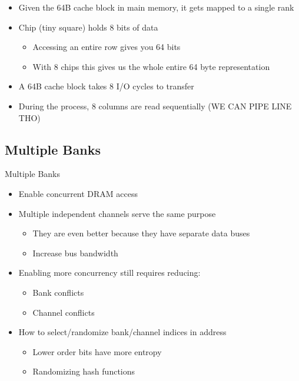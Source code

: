 \documentclass[]{article}
\providecommand{\tightlist}{%
  \setlength{\itemsep}{0pt}\setlength{\parskip}{0pt}}
\begin{document}
\begin{itemize}
\tightlist
\item
  Given the 64B cache block in main memory, it gets mapped to a single
  rank
\item
  Chip (tiny square) holds 8 bits of data

  \begin{itemize}
  \tightlist
  \item
    Accessing an entire row gives you 64 bits
  \item
    With 8 chips this gives us the whole entire 64 byte representation
  \end{itemize}
\item
  A 64B cache block takes 8 I/O cycles to transfer
\item
  During the process, 8 columns are read sequentially (WE CAN PIPE LINE
  THO)
\end{itemize}

\hypertarget{multiple-banks}{%
\subsection{Multiple Banks}\label{multiple-banks}}

Multiple Banks

\begin{itemize}
\tightlist
\item
  Enable concurrent DRAM access
\item
  Multiple independent channels serve the same purpose

  \begin{itemize}
  \tightlist
  \item
    They are even better because they have separate data buses
  \item
    Increase bus bandwidth
  \end{itemize}
\item
  Enabling more concurrency still requires reducing:

  \begin{itemize}
  \tightlist
  \item
    Bank conflicts
  \item
    Channel conflicts
  \end{itemize}
\item
  How to select/randomize bank/channel indices in address

  \begin{itemize}
  \tightlist
  \item
    Lower order bits have more entropy
  \item
    Randomizing hash functions
  \end{itemize}
\end{itemize}
\end{document}
